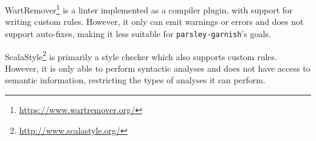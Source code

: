 WartRemover\footnote{\url{https://www.wartremover.org/}} is a linter implemented as a compiler plugin, with support for writing custom rules.
However, it only can emit warnings or errors and does not support auto-fixes, making it less suitable for \texttt{parsley-garnish}'s goals.

ScalaStyle\footnote{\url{http://www.scalastyle.org/}} is primarily a style checker which also supports custom rules.
However, it is only able to perform syntactic analyses and does not have access to semantic information, restricting the types of analyses it can perform.


